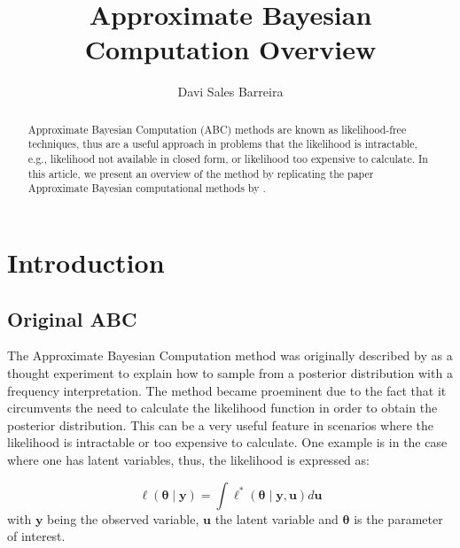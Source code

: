 \documentclass[runningheads]{llncs}
\begin{document}
%
\title{Approximate Bayesian Computation Overview}
%
%
\author{Davi Sales Barreira}
%
%
%
\maketitle              %
%
\begin{abstract}
Approximate Bayesian Computation (ABC)
methods are known as likelihood-free techniques, thus are a useful
approach in problems that the likelihood is intractable, e.g., likelihood
not available in closed form, or likelihood too expensive to calculate.
In this article, we present an overview of the method by replicating
the paper Approximate Bayesian computational
methods by \cite{Marin2012}.

\end{abstract}
%
%
%
\section{Introduction}
\subsection{Original ABC} \label{subsec:statistical-summaries}

The Approximate Bayesian Computation method was originally described
by \citet{Rubin1984} as a thought experiment to explain how to sample
from a posterior distribution with a frequency interpretation.
The method became proeminent due to the fact that it circumvents
the need to calculate the likelihood function in order to
obtain the posterior distribution. This can be a very useful
feature in scenarios where the likelihood is intractable or
too expensive to calculate. One example is in the case where
one has latent variables, thus, the likelihood is expressed as:

\begin{equation}
  \ell(\bm\theta \mid \bm y) =
  \bm\int \ell^*(\bm\theta \mid \bm y, \bm u) d\bm u
\end{equation}
with $\bm y$ being the observed variable,
$\bm u$ the latent variable and $\bm\theta$ is the parameter of interest.
\end{document}
